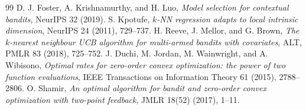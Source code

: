 \documentclass[11pt]{article}
\theoremstyle{definition}
\theoremstyle{remark}
\newcommand{\1}{\mathbf 1}
\begin{document}
\begin{thebibliography}{99}
 D. J. Foster, A. Krishnamurthy, and H. Luo, \emph{Model selection for
contextual bandits}, NeurIPS 32 (2019).
 S. Kpotufe, \emph{$k$-NN regression adapts to local intrinsic dimension},
NeurIPS 24 (2011), 729--737.
 H. Reeve, J. Mellor, and G. Brown, \emph{The $k$-nearest neighbour UCB algorithm
for multi-armed bandits with covariates}, ALT, PMLR 83 (2018), 725--752.
 J. Duchi, M. Jordan, M. Wainwright, and A. Wibisono, \emph{Optimal rates for
zero-order convex optimization: the power of two function evaluations}, IEEE Transactions on
Information Theory 61 (2015), 2788--2806.
 O. Shamir, \emph{An optimal algorithm for bandit and zero-order convex optimization
with two-point feedback}, JMLR 18(52) (2017), 1--11.
\end{thebibliography}
\end{document}
